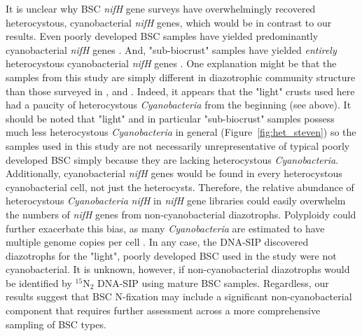 It is unclear why BSC \textit{nifH} gene surveys have overwhelmingly
recovered heterocystous, cyanobacterial \textit{nifH} genes, which would be
in contrast to our results. Even poorly developed BSC samples have yielded
predominantly cyanobacterial \textit{nifH} genes \citep{14766579}. And,
"sub-biocrust" samples have yielded \textit{entirely} heterocystous
cyanobacterial \textit{nifH} genes \citep{Yeager_2012}. One explanation might
be that the samples from this study are simply different in diazotrophic
community structure than those surveyed in \citet{Yeager}, \citet{14766579}
and \citet{Yeager_2012}.  Indeed, it appears that the "light" crusts used
here had a paucity of heterocystous \textit{Cyanobacteria} from the beginning
(see above). It should be noted that "light" and in particular "sub-biocrust"
samples possess much less heterocystous \textit{Cyanobacteria} in general
(Figure~\ref{fig:het_steven}) so the samples used in this study are not
necessarily unrepresentative of typical poorly developed BSC simply because
they are lacking heterocystous \textit{Cyanobacteria}. Additionally, cyanobacterial
\textit{nifH} genes would be found in every heterocystous cyanobacterial
cell, not just the heterocysts.  Therefore, the relative abundance of
heterocystous \textit{Cyanobacteria} \textit{nifH} in \textit{nifH} gene
libraries could easily overwhelm the numbers of \textit{nifH} genes from
non-cyanobacterial diazotrophs. Polyploidy could further exacerbate this bias,
as many \textit{Cyanobacteria} are estimated to have multiple genome copies
per cell \citep{Griese_2011}. In any case, the DNA-SIP discovered diazotrophs
for the "light", poorly developed BSC used in the study were not
cyanobacterial. It is unknown, however, if non-cyanobacterial diazotrophs
would be identified by $^{15}$N$_{2}$ DNA-SIP using mature BSC samples.
Regardless, our results suggest that BSC N-fixation may include a significant
non-cyanobacterial component that requires further assessment across a more
comprehensive sampling of BSC types.

